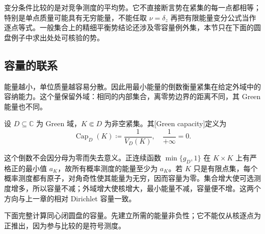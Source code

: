 变分条件比较的是对竞争测度的平均势。它不直接断言势在紧集的每一点都相等；特别是单点质量可能具有无穷能量，不能任取 \(\nu=\delta_z\) 再把有限能量变分公式当作逐点等式。一般集合上的精细平衡势结论还涉及零容量例外集，本节只在下面的圆盘例子中求出处处可核验的势。

\subsection{容量的联系}
\label{b3:subsec:170404}

能量越小，单位质量越容易分散。因此用最小能量的倒数衡量紧集在给定外域中的容纳能力。这个量保留外域：相同的内部集合，离零势边界的距离不同，其 Green 能量也不同。

\begin{definition}\label{b3:def:17-green-capacity}
设 \(D\subseteq\mathbb C\) 为 Green 域，\(K\Subset D\) 为非空紧集。其[Green capacity]定义为
\[
 \operatorname{Cap}_D(K)\coloneqq\frac1{V_D(K)},
 \quad \frac1{+\infty}=0.
\]
\end{definition}

这个倒数不会因分母为零而失去意义。正连续函数 \(\min\{g_D,1\}\) 在 \(K\times K\) 上有严格正的最小值 \(a_K\)，故所有概率测度的能量至少为 \(a_K\)。若 \(K\) 只是有限点集，每个概率测度都有原子，对角奇性使其能量为无穷，因而容量为零。集合增大使可选测度增多，所以容量不减；外域增大使核增大，最小能量不减，容量便不增。这两个方向与上一章的相对 Dirichlet 容量一致。

\ProseParagraphBreak

下面完整计算同心闭圆盘的容量。先建立所需的能量非负性；它不能仅从核逐点为正推出，因为参与比较的是符号测度。

